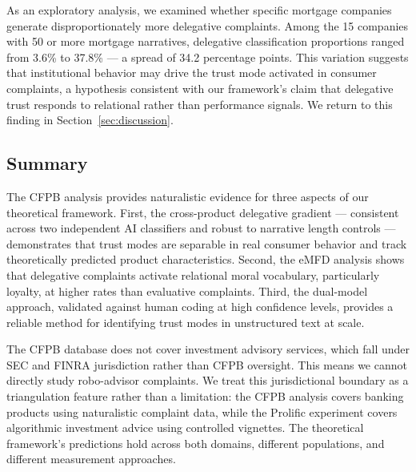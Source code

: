 As an exploratory analysis, we examined whether specific mortgage companies generate disproportionately more delegative complaints. Among the 15 companies with 50 or more mortgage narratives, delegative classification proportions ranged from 3.6\% to 37.8\% --- a spread of 34.2 percentage points. This variation suggests that institutional behavior may drive the trust mode activated in consumer complaints, a hypothesis consistent with our framework's claim that delegative trust responds to relational rather than performance signals. We return to this finding in Section~\ref{sec:discussion}.

\subsection{Summary}

The CFPB analysis provides naturalistic evidence for three aspects of our theoretical framework. First, the cross-product delegative gradient --- consistent across two independent AI classifiers and robust to narrative length controls --- demonstrates that trust modes are separable in real consumer behavior and track theoretically predicted product characteristics. Second, the eMFD analysis shows that delegative complaints activate relational moral vocabulary, particularly loyalty, at higher rates than evaluative complaints. Third, the dual-model approach, validated against human coding at high confidence levels, provides a reliable method for identifying trust modes in unstructured text at scale.

The CFPB database does not cover investment advisory services, which fall under SEC and FINRA jurisdiction rather than CFPB oversight. This means we cannot directly study robo-advisor complaints. We treat this jurisdictional boundary as a triangulation feature rather than a limitation: the CFPB analysis covers banking products using naturalistic complaint data, while the Prolific experiment covers algorithmic investment advice using controlled vignettes. The theoretical framework's predictions hold across both domains, different populations, and different measurement approaches.
